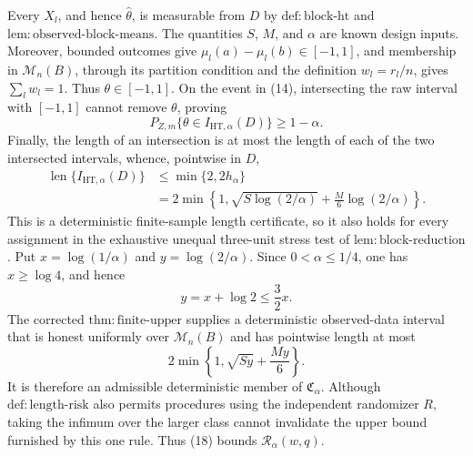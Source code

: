 Every \(X_l\), and hence \(\widehat\theta\), is measurable from
\(D\) by \(\mathrm{def{:}block\text{-}ht}\) and
\(\mathrm{lem{:}observed\text{-}block\text{-}means}\).  The quantities
\(S\), \(M\), and \(\alpha\) are known design inputs.  Moreover,
bounded outcomes give
\(\mu_l(a)-\mu_l(b)\in[-1,1]\), and membership in
\(\mathcal M_n(B)\), through its partition condition and the
definition \(w_l=r_l/n\), gives \(\sum_lw_l=1\).  Thus
\(\theta\in[-1,1]\).  On the event in (14), intersecting the raw
interval with \([-1,1]\) cannot remove \(\theta\), proving
\[
 P_{Z,m}\{\theta\in I_{\mathrm{HT},\alpha}(D)\}\ge1-\alpha.
\tag{15}
\]
Finally, the length of an intersection is at most the length of each
of the two intersected intervals, whence, pointwise in \(D\),
\[
\begin{aligned}
 \operatorname{len}\{I_{\mathrm{HT},\alpha}(D)\}
 &\le\min\{2,2h_\alpha\}\\
 &=2\min\!\left\{1,\sqrt{S\log(2/\alpha)}
       +\frac M6\log(2/\alpha)\right\}.
\end{aligned}
\tag{16}
\]
This is a deterministic finite-sample length certificate, so it also
holds for every assignment in the exhaustive unequal three-unit
stress test of \(\mathrm{lem{:}block\text{-}reduction}\).
Put \(x=\log(1/\alpha)\) and \(y=\log(2/\alpha)\).  Since
\(0<\alpha\le1/4\), one has \(x\ge\log4\), and hence
\[
 y=x+\log2\le\frac32x.
\tag{17}
\]
The corrected \(\mathrm{thm{:}finite\text{-}upper}\) supplies a
deterministic observed-data interval that is honest uniformly over
\(\mathcal M_n(B)\) and has pointwise length at most
\[
 2\min\left\{1,\sqrt{Sy}+\frac{My}{6}\right\}.
\tag{18}
\]
It is therefore an admissible deterministic member of
\(\mathfrak C_\alpha\).  Although
\(\mathrm{def{:}length\text{-}risk}\) also permits procedures using
the independent randomizer \(R\), taking the infimum over the larger
class cannot invalidate the upper bound furnished by this one rule.
Thus (18) bounds \(\mathcal R_\alpha(w,q)\).

